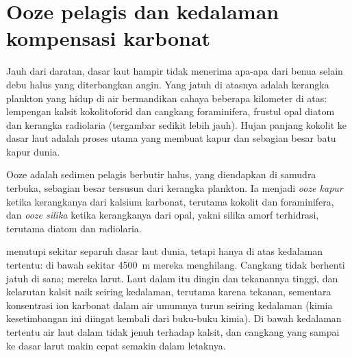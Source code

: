 \section{Ooze pelagis dan kedalaman kompensasi karbonat}\label{sec:b1:chemical-biogenic-sediments:oozes}

Jauh dari daratan, dasar laut hampir tidak menerima apa-apa dari benua selain debu halus yang diterbangkan angin. Yang jatuh di atasnya adalah kerangka plankton yang hidup di air bermandikan cahaya beberapa kilometer di atas: lempengan kalsit kokolitoforid dan cangkang foraminifera, frustul opal diatom dan kerangka radiolaria (tergambar sedikit lebih jauh). Hujan panjang kokolit ke dasar laut adalah proses utama yang membuat kapur dan sebagian besar batu kapur dunia.

\begin{definition}\label{def:b1:chemical-biogenic-sediments:ooze}
Ooze adalah sedimen pelagis berbutir halus, yang diendapkan di samudra terbuka, sebagian besar tersusun dari kerangka plankton. Ia menjadi \emph{ooze kapur} ketika kerangkanya dari kalsium karbonat, terutama kokolit dan foraminifera, dan \emph{ooze silika} ketika kerangkanya dari opal, yakni silika amorf terhidrasi, terutama diatom dan radiolaria.
\end{definition}

 menutupi sekitar separuh dasar laut dunia, tetapi hanya di atas kedalaman tertentu: di bawah sekitar \qty{4500}{m} mereka menghilang. Cangkang tidak berhenti jatuh di sana; mereka larut. Laut dalam itu dingin dan tekanannya tinggi, dan kelarutan kalsit naik seiring kedalaman, terutama karena tekanan, sementara konsentrasi ion karbonat dalam air umumnya turun seiring kedalaman (kimia kesetimbangan ini diingat kembali dari buku-buku kimia). Di bawah kedalaman tertentu air laut dalam tidak jenuh terhadap kalsit, dan cangkang yang sampai ke dasar larut makin cepat semakin dalam letaknya.


